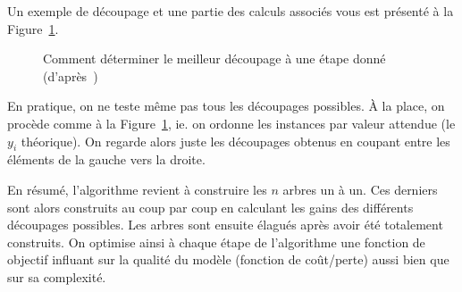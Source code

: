 Un exemple de découpage et une partie des calculs associés vous est présenté à la Figure~\ref{fig:pruning}.

\begin{figure}[h]
	\begin{margincap}
	  \centering
	  
	  \caption{Comment déterminer le meilleur découpage à une étape donné (d'après~\cite{bib:xgboost-article})}
	  \label{fig:pruning}
	\end{margincap}
\end{figure}

En pratique, on ne teste même pas tous les découpages possibles. À la place, on procède comme à la Figure~\ref{fig:pruning}, ie. on ordonne les instances par valeur attendue (le $y_i$ théorique). On regarde alors juste les découpages obtenus en coupant entre les éléments de la gauche vers la droite.

En résumé, l'algorithme revient à construire les $n$ arbres un à un. Ces derniers sont alors construits au coup par coup en calculant les gains des différents découpages possibles. Les arbres sont ensuite élagués après avoir été totalement construits. On optimise ainsi à chaque étape de l'algorithme une fonction de objectif influant sur la qualité du modèle (fonction de coût/perte) aussi bien que sur sa complexité.
